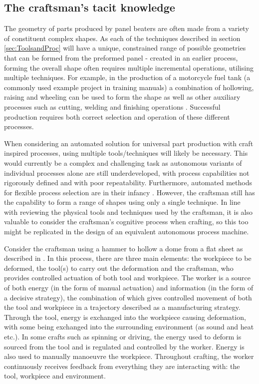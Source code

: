 \subsection{The craftsman's tacit knowledge} \label{sec:tacitknowledge}

The geometry of parts produced by panel beaters are often made from a variety of constituent complex shapes. As each of the techniques described in section \ref{sec:ToolsandProc} will have a unique, constrained range of possible geometries that can be formed from the preformed panel - created in an earlier process, forming the overall shape often requires multiple incremental operations, utilising multiple techniques. For example, in the production of a motorcycle fuel tank (a commonly used example project in training manuals) a combination of hollowing, raising and wheeling can be used to form the shape as well as other auxiliary processes such as cutting, welding and finishing operations \citep{Barr2013ProfessionalFabrication}. Successful production requires both correct selection and operation of these different processes. 

When considering an automated solution for universal part production with craft inspired processes, using multiple tools/techniques will likely be necessary. This would currently be a complex and challenging task as autonomous variants of individual processes alone are still underdeveloped, with process capabilities not rigorously defined and with poor repeatability. Furthermore, automated methods for flexible process selection are in their infancy \citep{Hamouche2018ClassificationLearning}. However, the craftsman still has the capability to form a range of shapes using only a single technique. In line with reviewing the physical tools and techniques used by the craftsman, it is also valuable to consider the craftsman's cognitive process when crafting, so this too might be replicated in the design of an equivalent autonomous process machine.

Consider the craftsman using a hammer to hollow a dome from a flat sheet as described in \citep{Barr2013ProfessionalFabrication}. In this process, there are three main elements: the workpiece to be deformed, the tool(s) to carry out the deformation and the craftsman, who provides controlled actuation of both tool and workpiece. The worker is a source of both energy (in the form of manual actuation) and information (in the form of a decisive strategy), the combination of which gives controlled movement of both the tool and workpiece in a trajectory described as a manufacturing strategy. Through the tool, energy is exchanged into the workpiece causing deformation, with some being exchanged into the surrounding environment (as sound and heat etc.). In some crafts such as spinning or driving, the energy used to deform is sourced from the tool and is regulated and controlled by the worker. Energy is also used to manually manoeuvre the workpiece. Throughout crafting, the worker continuously receives feedback from everything they are interacting with: the tool, workpiece and environment. 

